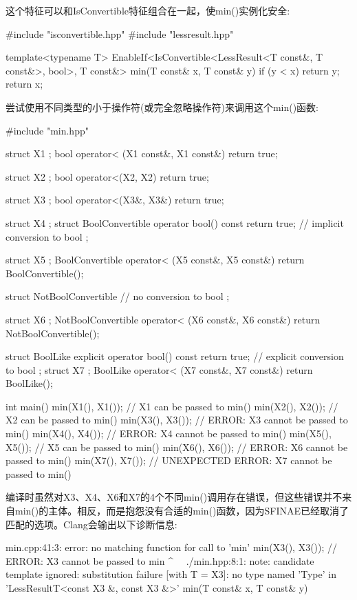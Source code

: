 这个特征可以和IsConvertible特征组合在一起，使min()实例化安全:

\begin{cpp}
#include "isconvertible.hpp"
#include "lessresult.hpp"

template<typename T>
EnableIf<IsConvertible<LessResult<T const&, T const&>, bool>,
		T const&>
min(T const& x, T const& y)
{
	if (y < x) {
		return y;
	}
	return x;
}
\end{cpp}

尝试使用不同类型的小于操作符(或完全忽略操作符)来调用这个min()函数:

\begin{cpp}
#include "min.hpp"

struct X1 { };
bool operator< (X1 const&, X1 const&) { return true; }

struct X2 { };
bool operator<(X2, X2) { return true; }

struct X3 { };
bool operator<(X3&, X3&) { return true; }

struct X4 { };
struct BoolConvertible {
	operator bool() const { return true; } // implicit conversion to bool
};

struct X5 { };
BoolConvertible operator< (X5 const&, X5 const&)
{
	return BoolConvertible();
}

struct NotBoolConvertible { // no conversion to bool
};

struct X6 { };
NotBoolConvertible operator< (X6 const&, X6 const&)
{
	return NotBoolConvertible();
}

struct BoolLike {
	explicit operator bool() const { return true; } // explicit conversion to bool
};
struct X7 { };
BoolLike operator< (X7 const&, X7 const&) { return BoolLike(); }

int main()
{
	min(X1(), X1()); // X1 can be passed to min()
	min(X2(), X2()); // X2 can be passed to min()
	min(X3(), X3()); // ERROR: X3 cannot be passed to min()
	min(X4(), X4()); // ERROR: X4 cannot be passed to min()
	min(X5(), X5()); // X5 can be passed to min()
	min(X6(), X6()); // ERROR: X6 cannot be passed to min()
	min(X7(), X7()); // UNEXPECTED ERROR: X7 cannot be passed to min()
}
\end{cpp}

编译时虽然对X3、X4、X6和X7的4个不同min()调用存在错误，但这些错误并不来自min()的主体。相反，而是抱怨没有合适的min()函数，因为SFINAE已经取消了匹配的选项。Clang会输出以下诊断信息:

\begin{shell}
min.cpp:41:3: error: no matching function for call to ’min’
min(X3(), X3()); // ERROR: X3 cannot be passed to min
^~~
./min.hpp:8:1: note: candidate template ignored: substitution failure
[with T = X3]: no type named ’Type’ in
’LessResultT<const X3 &, const X3 &>’
min(T const& x, T const& y)
\end{shell}

